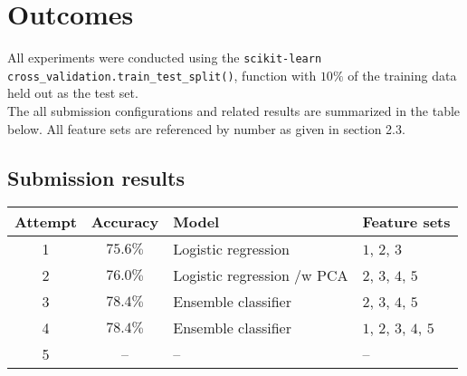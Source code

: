 \documentclass[
10pt, %
a4paper, %
oneside, %
headinclude,footinclude, %
BCOR5mm, %
]{scrartcl}
\begin{document}
\section{Outcomes}

All experiments were conducted using the \texttt{scikit-learn} 
\texttt{cross\_validation.train\_test\_split()}, function with $10\%$ of
the training data held out as the test set. \\

\noindent The all submission configurations and related results are 
summarized in the table below. All feature sets are referenced by number as 
given in section 2.3.

\subsection{Submission results}
\begin{center}
    \begin{tabular}{| c | c | l | l|}
    \hline
    Attempt & Accuracy  & Model               & Feature sets                         \\ \hline
    1       & $75.6\%$  & Logistic regression & $1$, $2$, $3$                        \\ \hline
    2       & $76.0\%$  & Logistic regression /w PCA &  $2$, $3$, $4$, $5$ \\ \hline
    3       & $78.4\%$  & Ensemble classifier &$2$, $3$, $4$, $5$                    \\ \hline
    4       & $78.4\%$  & Ensemble classifier & $1$, $2$, $3$, $4$, $5$              \\ \hline
    5       & --  & --  & --            \\ \hline
    \end{tabular}
\end{center}
\end{document}
